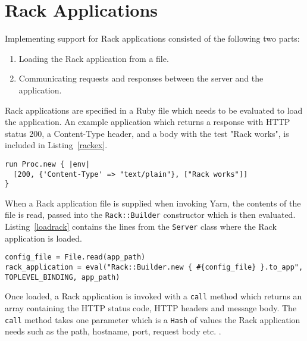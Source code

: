 \section{Rack Applications}
\label{rack}
Implementing support for Rack applications consisted of the following two parts: 

\begin{enumerate}
  \item Loading the Rack application from a file.
  \item Communicating requests and responses between the server and the application.
\end{enumerate}


Rack applications are specified in a Ruby file which needs to be evaluated to
load the application. An example application which returns
a response with HTTP status 200, a Content-Type header, and a body with the
test "Rack works", is included in Listing~\ref{rackex}.

\newpage
\begin{lstlisting}[label=rackex,caption=Sample Rack application. (test\_objects/config.ru:4)]
run Proc.new { |env|
  [200, {'Content-Type' => "text/plain"}, ["Rack works"]]
}
\end{lstlisting}

When a Rack application file is supplied when invoking Yarn, the contents of
the file is read, passed into the \texttt{Rack::Builder} constructor which is
then evaluated. Listing~\ref{loadrack} contains the lines from the
\texttt{Server} class where the Rack application is loaded.

\bigskip
\begin{lstlisting}[label=loadrack,caption=Loading a Rack application.
(Yarn/lib/yarn/server.rb:46)]
config_file = File.read(app_path)
rack_application = eval("Rack::Builder.new { #{config_file} }.to_app", TOPLEVEL_BINDING, app_path)
\end{lstlisting}

Once loaded, a Rack application is invoked with a \texttt{call} method which
returns an array containing the HTTP status code, HTTP headers and message
body. The \texttt{call} method takes one parameter which is a
\texttt{Hash} of values the Rack application needs such as the path, hostname,
port, request body etc. \cite{rackspec}. 

